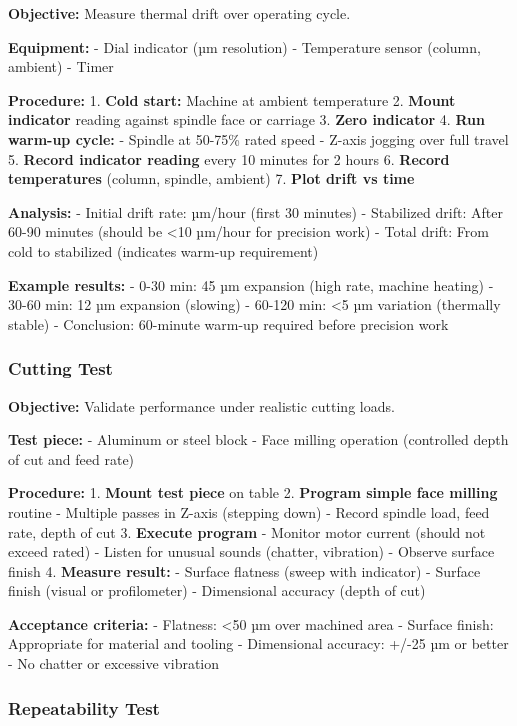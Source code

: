 \documentclass[
]{article}
\begin{document}
\textbf{Objective:} Measure thermal drift over operating cycle.

\textbf{Equipment:} - Dial indicator (µm resolution) - Temperature
sensor (column, ambient) - Timer

\textbf{Procedure:} 1. \textbf{Cold start:} Machine at ambient
temperature 2. \textbf{Mount indicator} reading against spindle face or
carriage 3. \textbf{Zero indicator} 4. \textbf{Run warm-up cycle:} -
Spindle at 50-75\% rated speed - Z-axis jogging over full travel 5.
\textbf{Record indicator reading} every 10 minutes for 2 hours 6.
\textbf{Record temperatures} (column, spindle, ambient) 7. \textbf{Plot
drift vs time}

\textbf{Analysis:} - Initial drift rate: µm/hour (first 30 minutes) -
Stabilized drift: After 60-90 minutes (should be \textless10 µm/hour for
precision work) - Total drift: From cold to stabilized (indicates
warm-up requirement)

\textbf{Example results:} - 0-30 min: 45 µm expansion (high rate,
machine heating) - 30-60 min: 12 µm expansion (slowing) - 60-120 min:
\textless5 µm variation (thermally stable) - Conclusion: 60-minute
warm-up required before precision work

\subsubsection{Cutting Test}\label{cutting-test}

\textbf{Objective:} Validate performance under realistic cutting loads.

\textbf{Test piece:} - Aluminum or steel block - Face milling operation
(controlled depth of cut and feed rate)

\textbf{Procedure:} 1. \textbf{Mount test piece} on table 2.
\textbf{Program simple face milling} routine - Multiple passes in Z-axis
(stepping down) - Record spindle load, feed rate, depth of cut 3.
\textbf{Execute program} - Monitor motor current (should not exceed
rated) - Listen for unusual sounds (chatter, vibration) - Observe
surface finish 4. \textbf{Measure result:} - Surface flatness (sweep
with indicator) - Surface finish (visual or profilometer) - Dimensional
accuracy (depth of cut)

\textbf{Acceptance criteria:} - Flatness: \textless50 µm over machined
area - Surface finish: Appropriate for material and tooling -
Dimensional accuracy: +/-25 µm or better - No chatter or excessive
vibration

\subsubsection{Repeatability Test}\label{repeatability-test}
\end{document}
